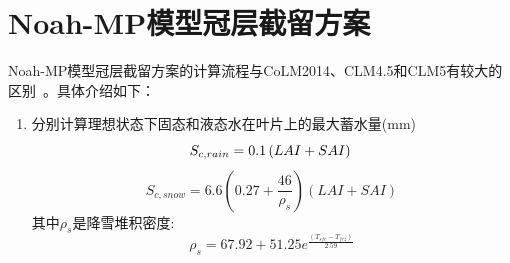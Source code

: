 \section{Noah-MP模型冠层截留方案}
Noah-MP模型冠层截留方案的计算流程与CoLM2014、CLM4.5和CLM5有较大的区别~\citep{niu2011community,he2023modernizing}。具体介绍如下：
\begin{enumerate}
\item 分别计算理想状态下固态和液态水在叶片上的最大蓄水量(mm)\\
\begin{equation}
S_{c,rain}=0.1\left(LAI+SAI\right)\\
\end{equation}
\begin{equation}
S_{c,snow}= 6.6\left(0.27+{\frac{46}{\rho_{s}}}\right) \left(LAI+SAI\right)
\end{equation}
其中$\rho_{s}$是降雪堆积密度: 
\begin{equation}
\rho_{s}=67.92+51.25 e^{\frac{\left(T_{s f c}-T_{f r z}\right)}{2.59}}
\end{equation}


\end{enumerate}
